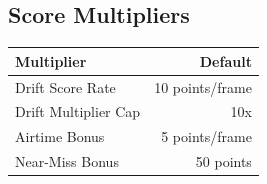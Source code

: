 \subsection{Score Multipliers}

\begin{table}[H]
\centering
\begin{tabular}{|l|r|}
\hline
\textbf{Multiplier} & \textbf{Default} \\
\hline
Drift Score Rate & 10 points/frame \\
Drift Multiplier Cap & 10x \\
Airtime Bonus & 5 points/frame \\
Near-Miss Bonus & 50 points \\
\hline
\end{tabular}
\end{table}

\newpage

